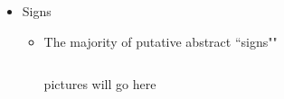 \documentclass[final,hyperref={pdfpagelabels=false}]{beamer}
\begin{document}
\begin{frame}
\begin{block}{}
\begin{itemize}
  \item Signs
  \begin{itemize}
    \item The majority of putative abstract ``signs""
    \begin{columns}
    \begin{column}{.33\textwidth}
     pictures will go here
    \end{column}
    \end{columns}
  \end{itemize}
\end{itemize}

\end{block}
\end{frame}
\end{document}
